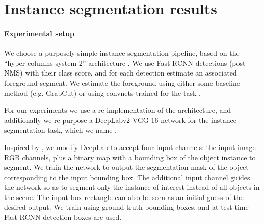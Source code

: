 \documentclass[10pt,english,british,twocolumn]{article}
\begin{document}
\section{\label{sec:Instance-segmentation-results}Instance segmentation results}

\paragraph{\label{sec:Instance-segmentation-setup}Experimental setup}

We choose a purposely simple instance segmentation pipeline, based
on the ``hyper-columns system 2'' architecture \cite{Hariharan2015Cvpr}.
We use Fast-RCNN \cite{Girshick2015IccvFastRCNN} detections (post-NMS)
with their class score, and for each detection estimate an associated
foreground segment. We estimate the foreground using either some baseline
method (e.g. GrabCut) or using convnets trained for the task \cite{Pinheiro2015Nips,Chen2016ArxivDeeplabv2}. 

For our experiments we use a re-implementation of the 
\cite{Pinheiro2015Nips} architecture, and additionally we re-purpose
a Deep\-Lab\-v2 VGG-16 network \cite{Chen2016ArxivDeeplabv2} for
the instance segmentation task, which we name . 

Inspired by \cite{Xu2016Cvpr,Carreira2016Cvpr}, we modify Deep\-Lab
to accept four input channels: the input image RGB channels, plus
a binary map with a bounding box of the object instance to segment.
We train the network  to output the segmentation
mask of the object corresponding to the input bounding box. The additional
input channel guides the network so as to segment only the instance
of interest instead of all objects in the scene. The input box rectangle
can also be seen as an initial guess of the desired output. We train
using ground truth bounding boxes, and at test time Fast-RCNN detection
boxes are used. 
\end{document}
